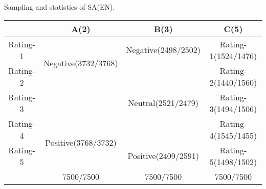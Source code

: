 \centering
\caption{Sampling and statistics of SA(EN).}
\begin{tabular}{|c|c|c|c|}
\hline
         & A(2)                                 & B(3)                & C(5)                \\ \hline
Rating-1 & \multirow{2}{*}{Negative(3732/3768)} & Negative(2498/2502) & Rating-1(1524/1476) \\ \cline{1-1} \cline{3-4} 
Rating-2 &                                      &                     & Rating-2(1440/1560) \\ \hline
Rating-3 &                                      & Neutral(2521/2479)  & Rating-3(1494/1506) \\ \hline
Rating-4 & \multirow{2}{*}{Positive(3768/3732)} &                     & Rating-4(1545/1455) \\ \cline{1-1} \cline{3-4} 
Rating-5 &                                      & Positive(2409/2591) & Rating-5(1498/1502) \\ \hline
         & 7500/7500                            & 7500/7500           & 7500/7500           \\ \hline
\end{tabular}
